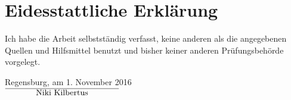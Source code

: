 \thispagestyle{empty}
\section*{Eidesstattliche Erkl\"arung}
Ich habe die Arbeit selbstst\"andig verfasst, keine anderen als die angegebenen
Quellen und Hilfsmittel benutzt und bisher keiner anderen Pr\"ufungsbeh\"orde
vorgelegt.\par
%
\vspace{3cm}
%
\par
\noindent
Regensburg, am 1. November 2016\\
\hspace*{\fill}
$\overline{\hspace{1.3cm}\text{Niki Kilbertus}\hspace{1.3cm}}$
